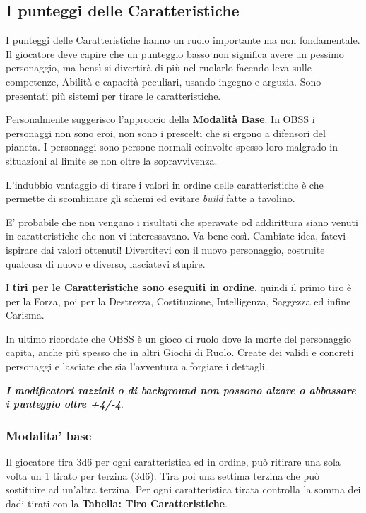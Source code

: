 \begin{multicols}{2}
\subsection{I punteggi delle Caratteristiche} \hypertarget{assegnazione.punteggi.caratteristica}{}\label{assegnazionepunteggicaratteristica}

I punteggi delle Caratteristiche hanno un ruolo importante ma non fondamentale. Il giocatore deve capire che un punteggio basso non significa avere un pessimo personaggio, ma bensì si divertirà di più nel ruolarlo facendo leva sulle competenze, Abilità e capacità peculiari, usando ingegno e arguzia. Sono presentati più sistemi per tirare le caratteristiche.

Personalmente suggerisco l'approccio della \textbf{Modalità Base}. In OBSS i personaggi non sono eroi, non sono i prescelti che si ergono a difensori del pianeta. I personaggi sono persone normali coinvolte spesso loro malgrado in situazioni al limite se non oltre la sopravvivenza.

L'indubbio vantaggio di tirare i valori in ordine delle caratteristiche è che permette di scombinare gli schemi ed evitare \emph{build} fatte a tavolino.

E' probabile che non vengano i risultati che speravate od addirittura siano venuti in caratteristiche che non vi interessavano. Va bene così. Cambiate idea, fatevi ispirare dai valori ottenuti! Divertitevi con il nuovo personaggio, costruite qualcosa di nuovo e diverso, lasciatevi stupire.

I \textbf{tiri per le Caratteristiche sono eseguiti in ordine}, quindi il primo tiro è per la Forza, poi per la Destrezza, Costituzione, Intelligenza, Saggezza ed infine Carisma.

In ultimo ricordate che OBSS è un gioco di ruolo dove la morte del personaggio capita, anche più spesso che in altri Giochi di Ruolo. Create dei validi e concreti personaggi e lasciate che sia l'avventura a forgiare i dettagli.

\textbf{\emph{I modificatori razziali o di background non possono alzare o abbassare i punteggio oltre +4/-4}}.

\subsubsection{Modalita' base}\label{modalitabase}

Il giocatore tira 3d6 per ogni caratteristica ed in ordine, può ritirare una sola volta un 1 tirato per terzina (3d6). Tira poi una settima terzina che può sostituire ad un'altra terzina. Per ogni caratteristica tirata controlla la somma dei dadi tirati con la \textbf{Tabella: Tiro Caratteristiche}.


\end{multicols}
